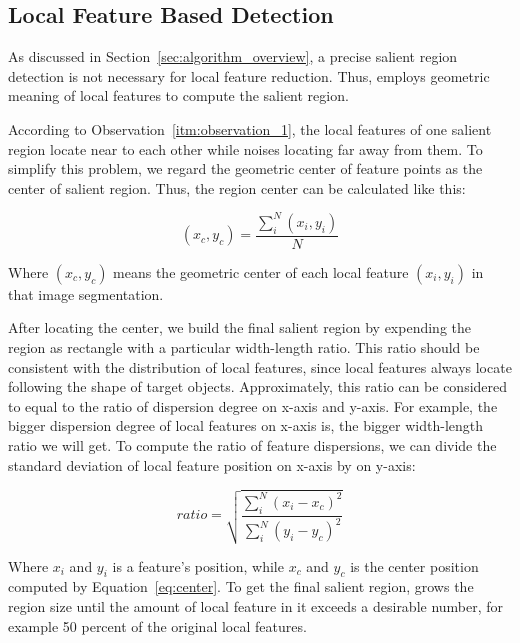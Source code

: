\subsection{Local Feature Based Detection}
\label{sec:algorithm_detection}

As discussed in Section~\ref{sec:algorithm_overview}, a precise salient region detection is not necessary for local feature reduction. Thus, {\sys} employs geometric meaning of local features to compute the salient region.

According to Observation~\ref{itm:observation_1}, the local features of one salient region locate near to each other while noises locating far away from them. To simplify this problem, we regard the geometric center of feature points as the center of salient region. Thus, the region center can be calculated like this:

{\begin{equation} \label{eq:center}
\left({x}_{c},{y}_{c} \right) = \frac{\sum_{i}^{N}\left({x}_{i},{y}_{i} \right)}{N}
\end{equation}}

Where $\left({x}_{c},{y}_{c} \right)$ means the geometric center of each local feature $\left({x}_{i},{y}_{i} \right)$ in that image segmentation.

After locating the center, we build the final salient region by expending the region as rectangle with a particular width-length ratio. This ratio should be consistent with the distribution of local features, since local features always locate following the shape of target objects. Approximately, this ratio can be considered to equal to the ratio of dispersion degree on x-axis and y-axis. For example, the bigger dispersion degree of local features on x-axis is, the bigger width-length ratio we will get. To compute the ratio of feature dispersions, we can divide the standard deviation of local feature position on x-axis by on y-axis:

{\begin{equation} \label{eq:ratio}
ratio = \sqrt{\frac{\sum_{i}^{N}\left ( x_{i}-x_{c} \right )^{2}}{\sum_{i}^{N}\left ( y_{i}-y_{c} \right )^{2}}}
\end{equation}}

Where $x_{i}$ and $y_{i}$ is a feature's position, while $x_{c}$ and $y_{c}$ is the center position computed by Equation~\ref{eq:center}. To get the final salient region, {\sys} grows the region size until the amount of local feature in it exceeds a desirable number, for example 50 percent of the original local features.

